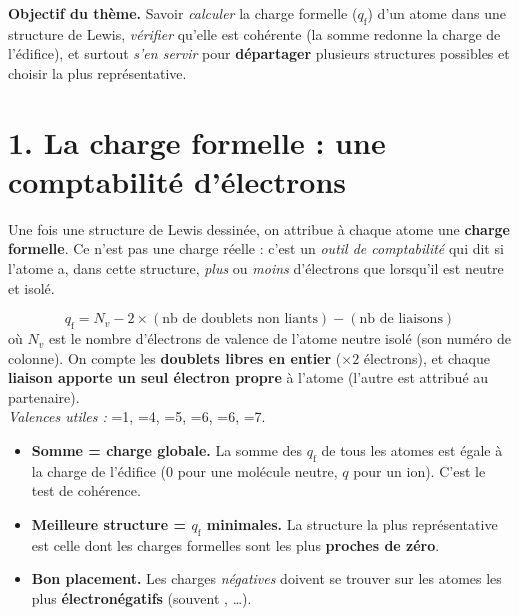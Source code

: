 \documentclass[11pt,a4paper]{article}
\newcommand{\CF}{\ensuremath{q_{\mathrm{f}}}}
\begin{document}
\begin{tcolorbox}[boxbase,colback=primary!12,colframe=primary,
   title={\Large Thème 3 — Charge formelle et choix de structure}]
\textbf{Objectif du thème.} Savoir \emph{calculer} la charge formelle (\CF) d'un atome dans une
structure de Lewis, \emph{vérifier} qu'elle est cohérente (la somme redonne la charge de
l'édifice), et surtout \emph{s'en servir} pour \textbf{départager} plusieurs structures possibles
et choisir la plus représentative.
\end{tcolorbox}

\section*{1. La charge formelle : une comptabilité d'électrons}

Une fois une structure de Lewis dessinée, on attribue à chaque atome une \textbf{charge formelle}.
Ce n'est pas une charge réelle : c'est un \emph{outil de comptabilité} qui dit si l'atome a, dans
cette structure, \emph{plus} ou \emph{moins} d'électrons que lorsqu'il est neutre et isolé.

\begin{defbox}
\[ \boxed{\;\CF = N_v - 2\times(\text{nb de doublets non liants}) - (\text{nb de liaisons})\;} \]
où $N_v$ est le nombre d'électrons de valence de l'atome neutre isolé (son numéro de colonne).
On compte les \textbf{doublets libres en entier} ($\times 2$ électrons), et chaque \textbf{liaison
apporte un seul électron propre} à l'atome (l'autre est attribué au partenaire).\\[2pt]
\footnotesize\emph{Valences utiles :} =1, =4, =5, =6, =6, =7.
\end{defbox}

\begin{defbox}
\begin{itemize}[leftmargin=1.5em,topsep=1pt,itemsep=2pt]
  \item \textbf{Somme = charge globale.} La somme des \CF{} de tous les atomes est égale à la charge
        de l'édifice ($0$ pour une molécule neutre, $q$ pour un ion). C'est le test de cohérence.
  \item \textbf{Meilleure structure = \CF{} minimales.} La structure la plus représentative est
        celle dont les charges formelles sont les plus \textbf{proches de zéro}.
  \item \textbf{Bon placement.} Les charges \emph{négatives} doivent se trouver sur les atomes les
        plus \textbf{électronégatifs} (souvent , \ldots).
\end{itemize}
\end{defbox}
\end{document}
